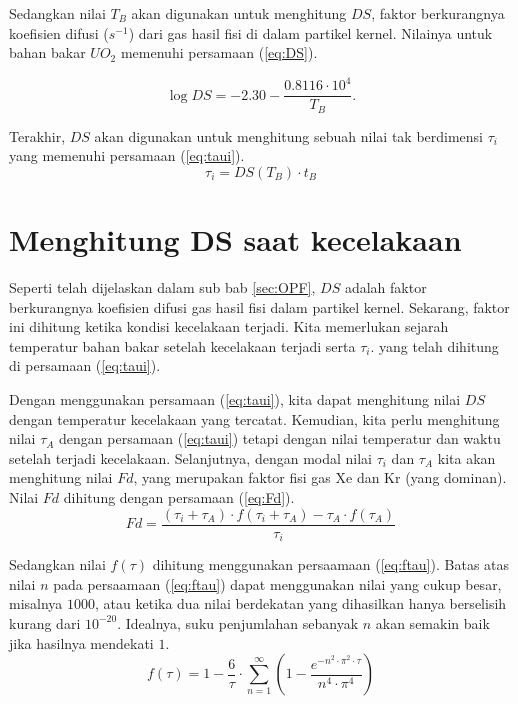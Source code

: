 \documentclass[a4paper,11pt]{report}
\begin{document}
Sedangkan nilai $T_B$ akan digunakan untuk menghitung $DS$, faktor berkurangnya koefisien difusi ($s^{-1}$) dari gas hasil fisi di dalam partikel kernel. Nilainya untuk bahan bakar $UO_2$ memenuhi persamaan (\ref{eq:DS}).

\begin{equation}
  \log DS=-2.30-\frac{0.8116 \cdot 10^4}{T_B}
  \label{eq:DS}.
\end{equation}

Terakhir, $DS$ akan digunakan untuk menghitung sebuah nilai tak berdimensi $\tau_i$ yang memenuhi persamaan (\ref{eq:taui}).
\begin{equation}
  \tau_i=DS(T_B) \cdot t_B
  \label{eq:taui}
\end{equation}

\section{Menghitung DS saat kecelakaan}
Seperti telah dijelaskan dalam sub bab \ref{sec:OPF}, $DS$ adalah faktor berkurangnya koefisien difusi gas hasil fisi dalam partikel kernel. Sekarang, faktor ini dihitung ketika kondisi kecelakaan terjadi. Kita memerlukan sejarah temperatur bahan bakar setelah kecelakaan terjadi serta $\tau_i$. yang telah dihitung di persamaan (\ref{eq:taui}).

Dengan menggunakan persamaan (\ref{eq:taui}), kita dapat menghitung nilai $DS$ dengan temperatur kecelakaan yang tercatat.  Kemudian, kita perlu menghitung nilai $\tau_A$ dengan persamaan (\ref{eq:taui}) tetapi dengan nilai temperatur dan waktu setelah terjadi kecelakaan. Selanjutnya, dengan modal nilai $\tau_i$ dan $\tau_A$ kita akan menghitung nilai $Fd$, yang merupakan faktor fisi gas Xe dan Kr (yang dominan). Nilai $Fd$ dihitung dengan persamaan (\ref{eq:Fd}).
\begin{equation}
  Fd=\frac{(\tau_i + \tau_A) \cdot f(\tau_i + \tau_A) - \tau_A \cdot f(\tau_A)}{\tau_i}
  \label{eq:Fd}
\end{equation}

Sedangkan nilai $f(\tau)$ dihitung menggunakan persaamaan (\ref{eq:ftau}). Batas atas nilai $n$ pada persaamaan (\ref{eq:ftau}) dapat menggunakan nilai yang cukup besar, misalnya $1000$, atau ketika dua nilai berdekatan yang dihasilkan hanya berselisih kurang dari $10^{-20}$. Idealnya, suku penjumlahan sebanyak $n$ akan semakin baik jika hasilnya mendekati $1$.
\begin{equation}
  f(\tau)=1-\frac{6}{\tau} \cdot \sum_{n=1}^{\infty} \left( 1-\frac{e^{-n^2 \cdot \pi^2 \cdot \tau}}{n^4 \cdot \pi^4} \right)
  \label{eq:ftau}
\end{equation}
\end{document}
